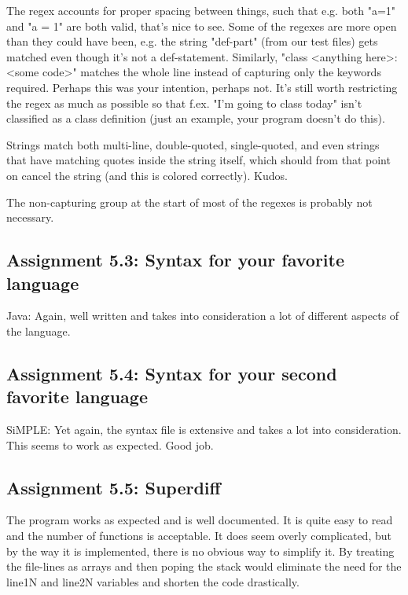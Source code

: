 \documentclass[a4paper]{article}
\begin{document}
The regex accounts for proper spacing between things, such that e.g. both "a=1" and "a = 1" are both valid, that's nice to see. Some of the regexes are more open than they could have been, e.g. the string "def-part" (from our test files) gets matched even though it's not a def-statement. Similarly, "class <anything here>: <some code>" matches the whole line instead of capturing only the keywords required. Perhaps this was your intention, perhaps not. It's still worth restricting the regex as much as possible so that f.ex. "I'm going to class today" isn't classified as a class definition (just an example, your program doesn't do this).

Strings match both multi-line, double-quoted, single-quoted, and even strings that have matching quotes inside the string itself, which should from that point on cancel the string (and this is colored correctly). Kudos.

The non-capturing group at the start of most of the regexes is probably not necessary.

\subsection*{Assignment 5.3: Syntax for your favorite language}
Java: Again, well written and takes into consideration a lot of different aspects of the language. 

\subsection*{Assignment 5.4:  Syntax for your second favorite language}
SiMPLE: Yet again, the syntax file is extensive and takes a lot into consideration. This seems to work as expected. Good job. 

\subsection*{Assignment 5.5: Superdiff}
The program works as expected and is well documented. It is quite easy to read and the number of functions is acceptable. It does seem overly complicated, but by the way it is implemented, there is no obvious way to simplify it. By treating the file-lines as arrays and then poping the stack would eliminate the need for the line1N and line2N variables and shorten the code drastically.
\end{document}
